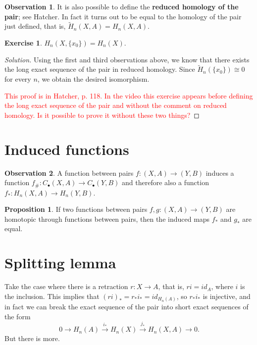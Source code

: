 \documentclass{book}
\theoremstyle{definition}
\newtheorem*{obs}{Observation}
\newtheorem*{prop}{Proposition}
\newtheorem*{ejer}{Exercise}
\begin{document}
\begin{obs}
It is also possible to define the \textbf{reduced homology of
the pair}; see Hatcher. In fact it turns out to be equal to
the homology of the pair just defined, that is,
$\tilde H_n(X,A)=H_n(X,A)$.
\end{obs}

\begin{ejer}
$H_n(X,\{x_0\})=H_n(X)$.
\begin{proof}[Solution]
Using the first and third observations above, we know that
there exists the long exact sequence of the pair in reduced
homology. Since $\tilde H_n(\{x_0\})\cong0$ for every $n$, we
obtain the desired isomorphism.

\textcolor{red}{This proof is in Hatcher, p. 118. In the
video this exercise appears before defining the long exact
sequence of the pair and without the comment on reduced
homology. Is it possible to prove it without these two
things?}
\end{proof}
\end{ejer}

\section{Induced functions}

\begin{obs}
A function between pairs $f:(X,A)\to(Y,B)$ induces a function
$f_\#:C_\bullet(X,A)\to C_\bullet(Y,B)$ and therefore also a
function $f_*:H_n(X,A)\to H_n(Y,B)$.
\end{obs}

\begin{prop}
If two functions between pairs $f,g:(X,A)\to(Y,B)$ are
homotopic through functions between pairs, then the induced
maps $f_*$ and $g_*$ are equal.
\end{prop}

\section{Splitting lemma}\label{subsec:splitting}

Take the case where there is a retraction $r:X\to A$, that
is, $ri=id_A$, where $i$ is the inclusion. This implies that
$(ri)_*=r_*i_*=id_{H_n(A)}$, so $r_*i_*$ is injective, and in
fact we can break the exact sequence of the pair into short
exact sequences of the form
$$
0\to H_n(A)\xrightarrow{i_*}H_n(X)
\xrightarrow{j_*}H_n(X,A)\to0.
$$
But there is more.
\end{document}
